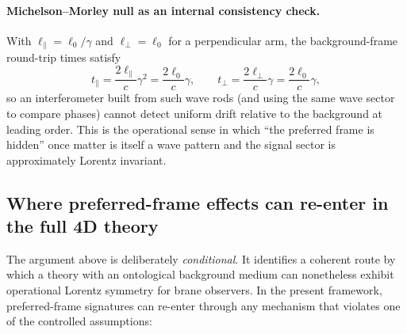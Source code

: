 \documentclass[11pt]{article}
\begin{document}
\paragraph{Michelson--Morley null as an internal consistency check.}
With $\ell_\parallel=\ell_0/\gamma$ and $\ell_\perp=\ell_0$ for a perpendicular arm,
the background-frame round-trip times satisfy
\begin{equation}
t_{\parallel}=\frac{2\ell_\parallel}{c}\gamma^2=\frac{2\ell_0}{c}\gamma,
\qquad
t_{\perp}=\frac{2\ell_\perp}{c}\gamma=\frac{2\ell_0}{c}\gamma,
\label{eq:MM_null_pref_frame}
\end{equation}
so an interferometer built from such wave rods (and using the same wave sector to compare phases)
cannot detect uniform drift relative to the background at leading order. This is the operational
sense in which ``the preferred frame is hidden'' once matter is itself a wave pattern and the
signal sector is approximately Lorentz invariant.

\subsection{Where preferred-frame effects can re-enter in the full 4D theory}
\label{sec:preferred_frame_violations}

The argument above is deliberately \emph{conditional}. It identifies a coherent route by which
a theory with an ontological background medium can nonetheless exhibit operational Lorentz
symmetry for brane observers. In the present framework, preferred-frame signatures can re-enter
through any mechanism that violates one of the controlled assumptions:
\end{document}

